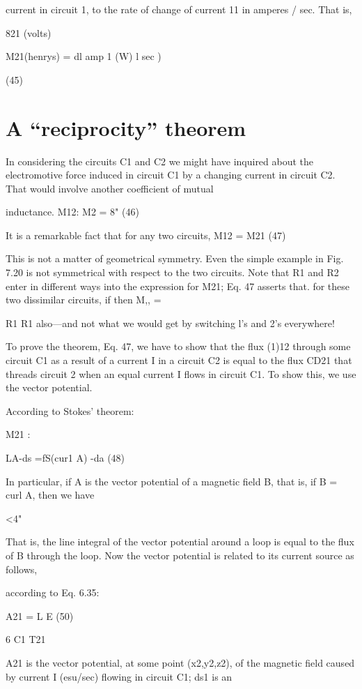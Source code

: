 current in circuit 1, to the rate of change of current 11 in amperes / sec.
That is,

821 (volts)

M21(henrys) = dl amp
1
(W) l sec )

(45)

\section{A ``reciprocity'' theorem}

In considering the circuits C1 and C2 we might have inquired about
the electromotive force induced in circuit C1 by a changing current
in circuit C2. That would involve another coefficient of mutual

inductance. M12:
M2 = 8" (46)

It is a remarkable fact that for any two circuits,
M12 = M21 (47)

This is not a matter of geometrical symmetry. Even the simple
example in Fig. 7.20 is not symmetrical with respect to the two
circuits. Note that R1 and R2 enter in different ways into the expression
for M21; Eq. 47 asserts that. for these two dissimilar circuits, if
 then M,, = 

R1 R1
also---and not what we would get by switching l's and 2's everywhere!

To prove the theorem, Eq. 47, we have to show that the flux (1)12
through some circuit C1 as a result of a current I in a circuit C2 is
equal to the flux CD21 that threads circuit 2 when an equal current I
flows in circuit C1. To show this, we use the vector potential.

According to Stokes' theorem:

M21 :

LA-ds =fS(cur1 A) -da (48)

In particular, if A is the vector potential of a magnetic field B, that is,
if B = curl A, then we have

<4"

That is, the line integral of the vector potential around a loop is equal
to the flux of B through the loop.
Now the vector potential is related to its current source as follows,

according to Eq. 6.35:

A21 = L E (50)

6 C1 T21

A21 is the vector potential, at some point (x2,y2,z2), of the magnetic
field caused by current I (esu/sec) flowing in circuit C1; ds1 is an

